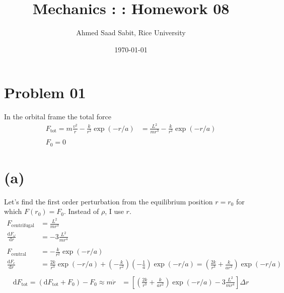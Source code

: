 \documentclass[letter, 10pts]{article}
\title{Mechanics : : Homework 08}
\author{Ahmed Saad Sabit, Rice University}
\date{\today}
\begin{document}
\maketitle


\section*{Problem 01} 

In the orbital frame the total force 
\begin{align*}
F_\text{tot} = m \frac{v^2}{r} - \frac{k}{r^2} \exp( - r  /a ) 
&= \frac{L^2}{m r^3}  - \frac{k}{r^2} \exp( - r  /a ) 
\\ \ \\
F_0 = 0 \tag{Equilibrium}
\end{align*}

\section*{(a)}
Let's find the first order perturbation from the equilibrium position $r = r_0$ for which $F(r_0) = F_0$. Instead of $\rho$, I use $r$. 
\begin{align*}
	F_\text{centrifugal} &= \frac{L^2}{m r^3} \\ 
	\frac{\mathrm{d} F_\omega}{\mathrm{d} r}&= -3 \frac{L^2}{m r^{4}}  \\ \ \\
	F_\text{central} &= - \frac{k}{r^2} \exp ( - r / a) \\ 
	\frac{\mathrm{d} F_c}{\mathrm{d} r} &= \frac{2k}{r^3} \exp (- r / a) + \left(- \frac{k}{r^2}\right) \left(- \frac{1}{a}\right) \exp( - r / a) =
	\left(\frac{2k}{r^3} + \frac{k}{a r^2} \right) \exp ( -r / a)\\
\end{align*}
\begin{align*}
	\mathrm{d} F_\text{tot} = \left(\mathrm{d} F_\text{tot} + F_0 \right) - F_0 \approx m \ddot{r} &= 
	\left[
	\left(\frac{2k}{r^3} + \frac{k}{a r^2} \right) \exp ( -r / a) - 3 \frac{L^2}{mr^{4}} 
\right] \Delta r
	\\
\end{align*}
\end{document}
